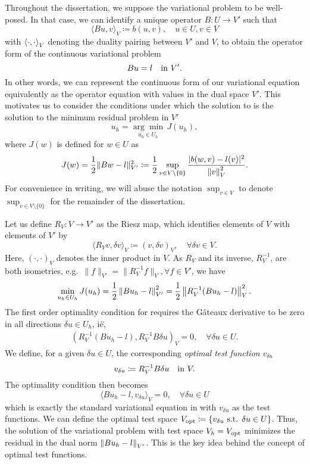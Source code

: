 Throughout the dissertation, we suppose the variational
problem  to be well-posed. In that case, we can
identify a unique operator $B:U\rightarrow V'$ such that
\[
\langle Bu,v\rangle_V \coloneqq b(u,v), \quad u\in U, v\in V
\]
with $\LRa{\cdot, \cdot}_V$ denoting the duality pairing between $V'$ and $V$, to obtain the operator form of the continuous variational problem
\begin{equation}
\eqnlab{dualEq}
Bu = l \quad \text{in } V'.
\end{equation}
In other words, we can represent the continuous form of our variational equation
 equivalently as the operator equation  with values in the
dual space $V'$.  This motivates us to consider the conditions under which the solution to  is the solution to the minimum residual problem in $V'$ 
\[
u_h = \underset{u_h\in U_h}{\arg\min}\, J(u_h),
\]
where $J(w)$ is defined for $w\in U$ as 
\[
J(w) = \frac{1}{2}\|Bw-l\|_{V'}^2 \coloneqq\frac{1}{2} \sup_{v\in V\setminus\{0\}} \frac{| b(w,v)-l(v)|^2}{\nor{v}_V^2}.
\]
For convenience in writing, we will abuse the notation $\sup_{v \in V}$ to denote $\sup_{v\in V\setminus\{0\}}$ for the remainder of the dissertation.

Let us define $R_V: V \to V'$ as the Riesz map, which identifies
elements of $V$ with elements of $V'$ by 
\[
\langle R_V v,\delta
v\rangle_V \coloneqq(v, \delta v)_V, \quad \forall \delta v \in V.
\]
Here, $(\cdot, \cdot)_V$ denotes the
inner product in $V$. As $R_V$ and its inverse, $R_V^{-1}$, are both
isometries, e.g.\ $\|f\|_{V'} = \|R_V^{-1} f\|_V, \forall f \in V'$, we
have
\begin{equation}
\eqnlab{minimization}
\min_{u_h\in U_h} J(u_h) = \frac{1}{2}\left\|Bu_h-l\right\|_{V'}^2 =  \frac{1}{2}\left\|R_V^{-1}(Bu_h-l)\right\|_V^2.
\end{equation}
The first order optimality condition for  requires
the G\^ateaux derivative to be zero in all directions $\delta u \in
U_h$, i\.e\.,
\begin{align*}
\left(R_V^{-1}(Bu_h-l),R_V^{-1}B\delta u\right)_V = 0, \quad \forall \delta u \in U. 
\end{align*}
We define, for a given $\delta u \in U$, the corresponding {\em optimal test function} $v_{\delta u}$
\begin{equation}
\eqnlab{optv}
v_{\delta u} \coloneqq R_V^{-1}B\delta u \quad  \text{in } V.
\end{equation} 
The optimality condition then becomes
\[
 \langle Bu_h-l, v_{\delta u}\rangle_V = 0, \quad \forall \delta u \in U
\]
which is exactly the standard variational equation in
  with $v_{\delta u}$ as the test functions. We can define the optimal test space $V_{\rm opt} \coloneqq \{v_{\delta u} \text{ s.t. } \delta u\in U\}$. Thus, the solution of the variational problem  with test space $V_h = V_{\rm opt}$ minimizes the residual in the dual norm $\nor{Bu_h-l}_{V'}$. This is the key idea behind the concept of optimal test functions. 

